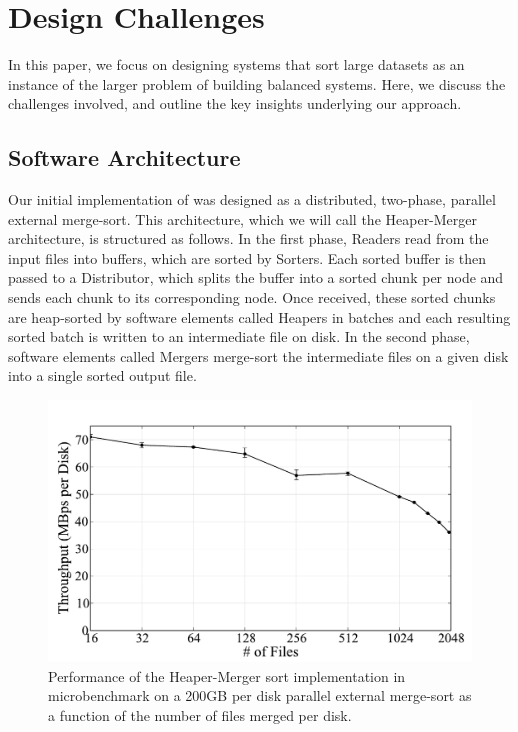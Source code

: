 \section{Design Challenges}
\label{tritonsort:sec:challenges}

In this paper, we focus on designing systems that sort large datasets as an
instance of the larger problem of building balanced systems.  Here, we discuss
the challenges involved, and outline the key insights underlying our approach.

\subsection{Software Architecture}

Our initial implementation of \tritonsort was designed as a distributed,
two-phase, parallel external merge-sort.  This architecture, which we will call
the Heaper-Merger architecture, is structured as follows.  In the first phase,
Readers read from the input files into buffers, which are sorted by Sorters.
Each sorted buffer is then passed to a Distributor, which splits the buffer
into a sorted chunk per node and sends each chunk to its corresponding node.
Once received, these sorted chunks are heap-sorted by software elements called
Heapers in batches and each resulting sorted batch is written to an
intermediate file on disk.  In the second phase, software elements called
Mergers merge-sort the intermediate files on a given disk into a single sorted
output file.

\begin{figure}
 \centering
 \includegraphics[width=\columnwidth]{tritonsort/graphs/mergesortbench.pdf}
 \caption{\label{fig:mergesort}Performance of the Heaper-Merger sort
   implementation in microbenchmark on a 200GB per disk parallel external merge-sort as a function of the number of files merged per disk.}
\end{figure}


